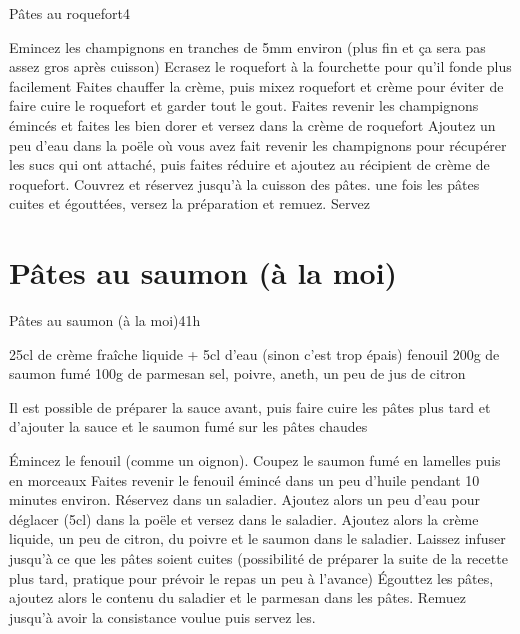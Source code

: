 {\begin{recette}{Pâtes au roquefort}{4}{}{}
\begin{preparation}
\etape Emincez les champignons en tranches de 5mm environ (plus fin et ça sera pas assez gros après cuisson)
\etape Ecrasez le roquefort à la fourchette pour qu'il fonde plus facilement
\etape Faites chauffer la crème, puis mixez roquefort et crème pour éviter de faire cuire le roquefort et garder tout le gout.
\etape Faites revenir les champignons émincés et faites les bien dorer et versez dans la crème de roquefort
\etape Ajoutez un peu d'eau dans la poële où vous avez fait revenir les champignons pour récupérer les sucs qui ont attaché, puis faites réduire et ajoutez au récipient de crème de roquefort. Couvrez et réservez jusqu'à la cuisson des pâtes. 
\etape une fois les pâtes cuites et égouttées, versez la préparation et remuez. 
\etape Servez
\end{preparation}
\end{recette}

\section{Pâtes au saumon (à la moi)}
\begin{recette}{Pâtes au saumon (à la moi)}{4}{1h}{}
\begin{ingredients}
\ingredient 25cl de crème fraîche liquide + 5cl d'eau (sinon c'est trop épais)
 fenouil
\ingredient 200g de saumon fumé
\ingredient 100g de parmesan
\ingredient sel, poivre, aneth, un peu de jus de citron
\end{ingredients}

\begin{remarque}
Il est possible de préparer la sauce avant, puis faire cuire les pâtes plus tard et d'ajouter la sauce et le saumon fumé sur les pâtes chaudes
\end{remarque}


\begin{preparation}
\etape Émincez le fenouil (comme un oignon). Coupez le saumon fumé en lamelles puis en morceaux
\etape Faites revenir le fenouil émincé dans un peu d'huile pendant 10 minutes environ.
\etape Réservez dans un saladier. 
\etape Ajoutez alors un peu d'eau pour déglacer (5cl) dans la poële et versez dans le saladier. 
\etape Ajoutez alors la crème liquide, un peu de citron, du poivre et le saumon dans le saladier. 
\etape Laissez infuser jusqu'à ce que les pâtes soient cuites (possibilité de préparer la suite de la recette plus tard, pratique pour prévoir le repas un peu à l'avance)
\etape Égouttez les pâtes, ajoutez alors le contenu du saladier et le parmesan dans les pâtes. 
\etape Remuez jusqu'à avoir la consistance voulue puis servez les.
\end{preparation}
\end{recette}


}
